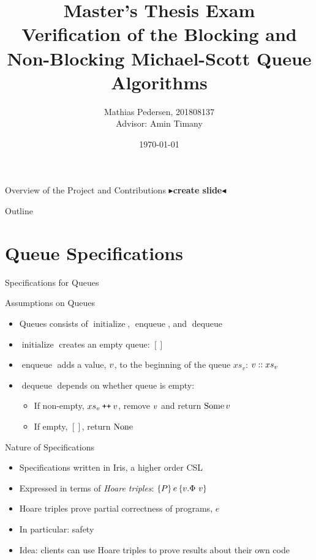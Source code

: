 \documentclass[9pt]{beamer}
\title{Master's Thesis Exam\\
Verification of the Blocking and Non-Blocking Michael-Scott Queue Algorithms}
\author{
  Mathias Pedersen, 201808137 \texorpdfstring{\\}{with}
  {\small Advisor: Amin Timany}
}
\institute{Aarhus University}
\date{\today}
\newcommand{\initialise}{\operatorname{initialize}}
\newcommand{\enqueue}{\operatorname{enqueue}}
\newcommand{\dequeue}{\operatorname{dequeue}}
\newcommand{\absvalue}{\val}
\newcommand{\absvalueList}{xs_v}
\newcommand\catenate{\mathbin{\text{\ttfamily\upshape ++}}}
\newcommand{\todo}[1]{{\color[rgb]{.5,0,0}\textbf{$\blacktriangleright$#1$\blacktriangleleft$}}}
\begin{document}
\frame{\titlepage}


\begin{frame}{Overview of the Project and Contributions}
  \todo{create slide}
\end{frame}


\begin{frame}{Outline}
  \tableofcontents
\end{frame}


\section{Queue Specifications}

\begin{frame}{Specifications for Queues}
  \begin{block}{Assumptions on Queues}
    \begin{itemize}
      \item Queues consists of $\initialise$, $\enqueue$, and $\dequeue$
      \item $\initialise$ creates an empty queue: $[]$
      \item $\enqueue$ adds a value, $\absvalue$, to the beginning of the queue $\absvalueList$: $\absvalue :: \absvalueList$
      \item $\dequeue$ depends on whether queue is empty:
        \begin{itemize}
          \item If non-empty, $\absvalueList \catenate \absvalue$, remove $\absvalue$ and return $\Some \absvalue$
          \item If empty, $[]$, return $\operatorname{None}$
        \end{itemize}
    \end{itemize}
  \end{block}
  \begin{block}{Nature of Specifications}
    \begin{itemize}
      \item Specifications written in Iris, a higher order CSL
      \item Expressed in terms of \textit{Hoare triples}: $\hoare{P}{e}{v. \Phi ~ v}$
      \item Hoare triples prove partial correctness of programs, $e$
      \item In particular: safety
      \item Idea: clients can use Hoare triples to prove results about their own code
    \end{itemize}
  \end{block}
\end{frame}
\end{document}
